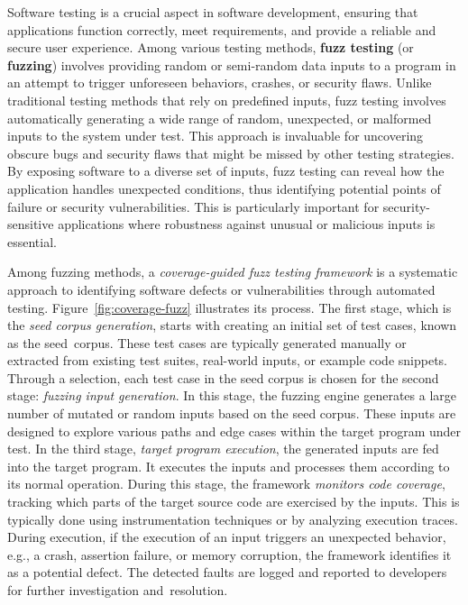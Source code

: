 Software testing is a crucial aspect in software development, ensuring
that applications function correctly, meet requirements, and provide a
reliable and secure user experience. Among various testing methods,
{\bf fuzz testing} (or {\bf fuzzing}) involves providing random or
semi-random data inputs to a program in an attempt to trigger
unforeseen behaviors, crashes, or security flaws. Unlike traditional
testing methods that rely on predefined inputs, fuzz testing involves
automatically generating a wide range of random, unexpected, or
malformed inputs to the system under test. This approach is invaluable
for uncovering obscure bugs and security flaws that might be missed by
other testing strategies. By exposing software to a diverse set of
inputs, fuzz testing can reveal how the application handles unexpected
conditions, thus identifying potential points of failure or security
vulnerabilities. This is particularly important for security-sensitive
applications where robustness against unusual or malicious inputs is
essential.


Among fuzzing methods, a {\em coverage-guided fuzz testing framework}
is a systematic approach to identifying software defects or
vulnerabilities through automated
testing. Figure~\ref{fig:coverage-fuzz} illustrates its process. The
first stage, which is the {\em seed corpus generation}, starts with
creating an initial set of test cases, known as the seed~corpus. These
test cases are typically generated manually or extracted from existing
test suites, real-world inputs, or example code snippets. Through a
selection, each test case in the seed corpus is chosen for the second
stage: {\em fuzzing input generation}. In this stage, the fuzzing
engine generates a large number of mutated or random inputs based on
the seed corpus. These inputs are designed to explore various paths
and edge cases within the target program under test. In the third
stage, {\em target program execution}, the generated inputs are fed
into the target program. It executes the inputs and processes them
according to its normal operation. During this stage, the framework
{\em monitors code coverage}, tracking which parts of the target
source code are exercised by the inputs. This is typically done using
instrumentation techniques or by analyzing execution traces. During
execution, if the execution of an input triggers an unexpected
behavior, e.g., a crash, assertion failure, or memory corruption, the
framework identifies it as a potential defect. The detected faults are
logged and reported to developers for further investigation
and~resolution.

